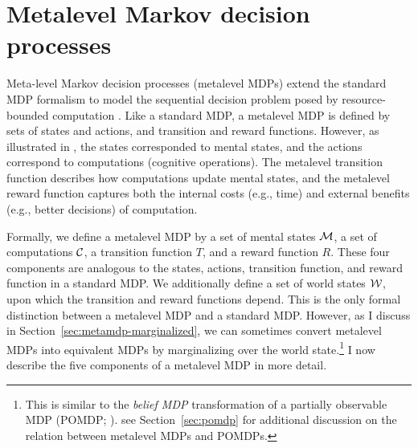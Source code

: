 \section{Metalevel Markov decision processes}\label{sec:metalevel-mdps}


Meta-level Markov decision processes (metalevel MDPs) extend the standard MDP formalism to model the sequential decision problem posed by resource-bounded computation \citep{hay2012selecting}. Like a standard MDP, a metalevel MDP is defined by sets of states and actions, and transition and reward functions. However, as illustrated in , the states corresponded to mental states, and the actions correspond to computations (cognitive operations). The metalevel transition function describes how computations update mental states, and the metalevel reward function captures both the internal costs (e.g., time) and external benefits (e.g., better decisions) of computation.

Formally, we define a metalevel MDP by a set of mental states $\mathcal{M}$, a set of computations $\mathcal{C}$, a transition function $T$, and a reward function $R$. These four components are analogous to the states, actions, transition function, and reward function in a standard MDP. We additionally define a set of world states $\mathcal{W}$, upon which the transition and reward functions depend. This is the only formal distinction between a metalevel MDP and a standard MDP. However, as I discuss in Section~\ref{sec:metamdp-marginalized}, we can sometimes convert metalevel MDPs into equivalent MDPs by marginalizing over the world state.\footnote{%
  This is similar to the \emph{belief MDP} transformation of a partially observable MDP (POMDP; \citealp{kaelbling1998planningb}). see Section~\ref{sec:pomdp} for additional discussion on the relation between metalevel MDPs and POMDPs.
} I now describe the five components of a metalevel MDP in more detail.



